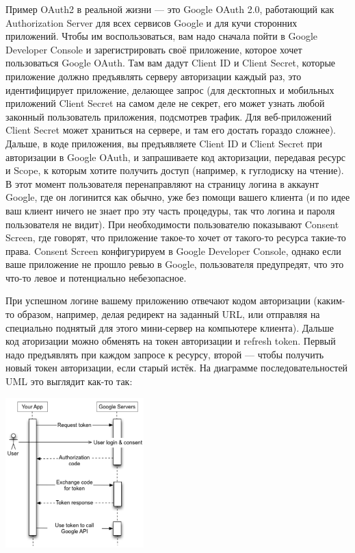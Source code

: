\documentclass{../../text-style}
\begin{document}
Пример OAuth2 в реальной жизни --- это Google OAuth 2.0, работающий как Authorization Server для всех сервисов Google и для кучи сторонних приложений. Чтобы им воспользоваться, вам надо сначала пойти в Google Developer Console и зарегистрировать своё приложение, которое хочет пользоваться Google OAuth. Там вам дадут Client ID и Client Secret, которые приложение должно предъявлять серверу авторизации каждый раз, это идентифицирует приложение, делающее запрос (для десктопных и мобильных приложений Client Secret на самом деле не секрет, его может узнать любой законный пользователь приложения, подсмотрев трафик. Для веб-приложений Client Secret может храниться на сервере, и там его достать гораздо сложнее). Дальше, в коде приложения, вы предъявляете Client ID и Client Secret при авторизации в Google OAuth, и запрашиваете код акторизации, передавая ресурс и Scope, к которым хотите получить доступ (например, к гуглодиску на чтение). В этот момент пользователя перенаправляют на страницу логина в аккаунт Google, где он логинится как обычно, уже без помощи вашего клиента (и по идее ваш клиент ничего не знает про эту часть процедуры, так что логина и пароля пользователя не видит). При необходимости пользователю показывают Consent Screen, где говорят, что приложение такое-то хочет от такого-то ресурса такие-то права. Consent Screen конфигурируем в Google Developer Console, однако если ваше приложение не прошло ревью в Google, пользователя предупредят, что это что-то левое и потенциально небезопасное.

При успешном логине вашему приложению отвечают кодом авторизации (каким-то образом, например, делая редирект на заданный URL, или отправляя на специально поднятый для этого мини-сервер на компьютере клиента). Дальше код аторизации можно обменять на токен авторизации и refresh token. Первый надо предъявлять при каждом запросе к ресурсу, второй --- чтобы получить новый токен авторизации, если старый истёк. На диаграмме последовательностей UML это выглядит как-то так:

\begin{center}
    \includegraphics[width=0.4\textwidth]{googleOAuth.png}
\end{center}
\end{document}

